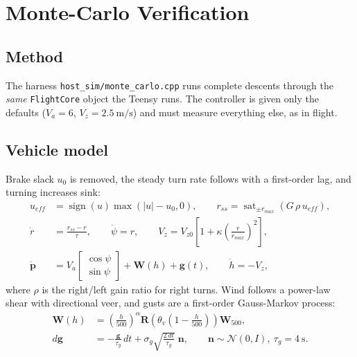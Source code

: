 \documentclass[11pt,a4paper]{article}
\newcommand{\code}[1]{\texttt{#1}}
\newcommand{\vect}[1]{\mathbf{#1}}
\newcommand{\sat}{\operatorname{sat}}
\begin{document}
\section{Monte-Carlo Verification}

\subsection{Method}
The harness \code{host\_sim/monte\_carlo.cpp} runs complete descents through
the \emph{same} \code{FlightCore} object the Teensy runs. The controller is
given only the defaults ($V_a = 6$, $V_z = \SI{2.5}{\meter\per\second}$) and
must measure everything else, as in flight.

\subsection{Vehicle model}
Brake slack $u_0$ is removed, the steady turn rate follows with a first-order
lag, and turning increases sink:
\begin{align}
  u_{eff} &= \operatorname{sign}(u)\max(|u| - u_0, 0), \qquad
  r_{ss} = \sat_{\pm r_{max}}\!\left(G\,\rho\, u_{eff}\right),\\
  \dot r &= \frac{r_{ss} - r}{\tau}, \qquad \dot\psi = r, \qquad
  V_z = V_{z0}\left[1 + \kappa\left(\frac{r}{r_{max}}\right)^{2}\right],\\
  \dot{\vect p} &= V_a\begin{bmatrix}\cos\psi\\ \sin\psi\end{bmatrix} + \vect W(h) + \vect g(t),
  \qquad \dot h = -V_z,
\end{align}
where $\rho$ is the right/left gain ratio for right turns. Wind follows a
power-law shear with directional veer, and gusts are a first-order
Gauss-Markov process:
\begin{align}
  \vect W(h) &= \left(\frac{h}{500}\right)^{\alpha} \mathbf{R}\!\left(\theta_v\left(1 - \tfrac{h}{500}\right)\right)\vect W_{500},\\
  d\vect g &= -\frac{\vect g}{\tau_g}\,dt + \sigma_g\sqrt{\frac{2\,dt}{\tau_g}}\;\vect n, \qquad \vect n \sim \mathcal N(0, I),\ \tau_g = \SI{4}{\second}.
\end{align}
\end{document}
